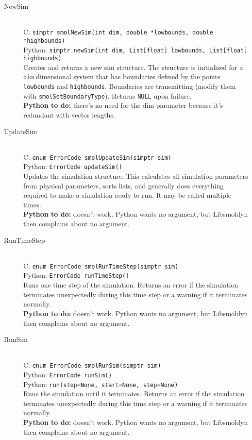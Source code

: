 \documentclass {book}
\newcommand {\ttt} {\texttt}
\begin{document}
\begin{description}

\item[NewSim]
\hfill \\
C: \ttt{simptr smolNewSim(int dim, double *lowbounds, double *highbounds)}\\
Python: \ttt{simptr newSim(int dim, List[float] lowbounds, List[float] highbounds)}\\
Creates and returns a new sim structure. The structure is initialized for a \ttt{dim} dimensional system that has boundaries defined by the points \ttt{lowbounds} and \ttt{highbounds}. Boundaries are transmitting (modify them with \ttt{smolSetBoundaryType}). Returns \ttt{NULL} upon failure.\\
\textbf{Python to do:} there's no need for the dim parameter because it's redundant with vector lengths.

\item[UpdateSim]
\hfill \\
C: \ttt{enum ErrorCode smolUpdateSim(simptr sim)}\\
Python: \ttt{ErrorCode updateSim()}\\
Updates the simulation structure. This calculates all simulation parameters from physical parameters, sorts lists, and generally does everything required to make a simulation ready to run. It may be called multiple times.\\
\textbf{Python to do:} doesn't work. Python wants no argument, but Libsmoldyn then complains about no argument.

\item[RunTimeStep]
\hfill \\
C: \ttt{enum ErrorCode smolRunTimeStep(simptr sim)}\\
Python: \ttt{ErrorCode runTimeStep()}\\
Runs one time step of the simulation. Returns an error if the simulation terminates unexpectedly during this time step or a warning if it terminates normally.\\
\textbf{Python to do:} doesn't work. Python wants no argument, but Libsmoldyn then complains about no argument.

\item[RunSim]
\hfill \\
C: \ttt{enum ErrorCode smolRunSim(simptr sim)}\\
Python: \ttt{ErrorCode runSim()}\\
Python: \ttt{run(stop=None, start=None, step=None)}\\
Runs the simulation until it terminates. Returns an error if the simulation terminates unexpectedly during this time step or a warning if it terminates normally.\\
\textbf{Python to do:} doesn't work. Python wants no argument, but Libsmoldyn then complains about no argument.


\end{description}
\end{document}
